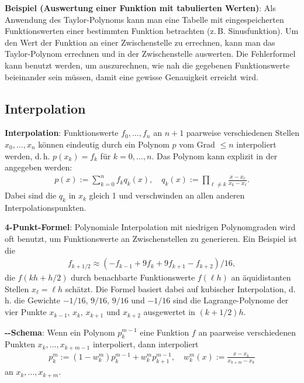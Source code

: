 \linie

\textbf{Beispiel (Auswertung einer Funktion mit tabulierten Werten)}:
Als Anwendung des Taylor-Polynoms kann man eine Tabelle mit eingespeicherten
Funktionswerten einer bestimmten Funktion betrachten (z.\,B. Sinusfunktion).
Um den Wert der Funktion an einer Zwischenstelle zu errechnen, kann man das Taylor-Polynom
errechnen und in der Zwischenstelle auswerten.
Die Fehlerformel kann benutzt werden, um auszurechnen, wie nah die gegebenen Funktionswerte
beieinander sein müssen, damit eine gewisse Genauigkeit erreicht wird.

\pagebreak

\subsection{%
    Interpolation%
}

\textbf{Interpolation}:
Funktionswerte $f_0, \dotsc, f_n$ an $n + 1$ paarweise verschiedenen Stellen $x_0, \dotsc, x_n$
können eindeutig durch ein Polynom $p$ vom Grad $\le n$ interpoliert werden,
d.\,h. $p(x_k) = f_k$ für $k = 0, \dotsc, n$.
Das Polynom kann explizit in der  angegeben werden:
\begin{align*}
    p(x) := \sum_{k=0}^n f_k q_k(x),\quad
    q_k(x) := \prod_{\ell\not=k} \frac{x - x_\ell}{x_k - x_\ell}.
\end{align*}
Dabei sind die  $q_k$ in $x_k$ gleich 1 und verschwinden an
allen anderen Interpolationspunkten.

\linie

\textbf{4-Punkt-Formel}:
Polynomiale Interpolation mit niedrigen Polynomgraden wird oft benutzt, um Funktionswerte
an Zwischenstellen zu generieren.
Ein Beispiel ist die 
\begin{align*}
    f_{k+1/2} \approx (-f_{k-1} + 9f_k + 9f_{k+1} - f_{k+2})/16,
\end{align*}
die $f(kh + h/2)$ durch benachbarte Funktionswerte $f(\ell h)$ an äquidistanten Stellen
$x_\ell = \ell h$ schätzt.
Die Formel basiert dabei auf kubischer Interpolation,
d.\,h. die Gewichte $-1/16$, $9/16$, $9/16$ und $-1/16$ sind die Lagrange-Polynome 
der vier Punkte $x_{k-1}$, $x_k$, $x_{k+1}$ und $x_{k+2}$ ausgewertet in $(k + 1/2)h$.

\linie

\textbf{--Schema}:
Wenn ein Polynom $p_k^{m-1}$ eine Funktion $f$ an paarweise verschiedenen Punkten
$x_k, \dotsc, x_{k+m-1}$ interpoliert, dann interpoliert
\begin{align*}
    p_k^m := (1 - w_k^m) p_k^{m-1} + w_k^m p_{k+1}^{m-1},\quad
    w_k^m(x) := \frac{x - x_k}{x_{k+m} - x_k}
\end{align*}
an $x_k, \dotsc, x_{k+m}$.

